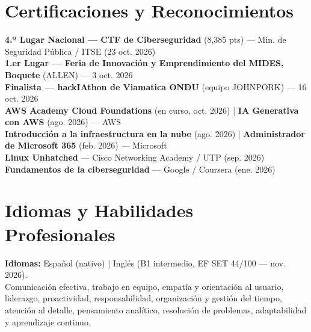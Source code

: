 \documentclass[10pt,a4paper]{article}
\begin{document}
\section*{Certificaciones y Reconocimientos}
{\small
\textbf{4.º Lugar Nacional — CTF de Ciberseguridad} (8,385 pts) — Min. de Seguridad Pública / ITSE (23 oct. 2026)\\
\textbf{1.er Lugar — Feria de Innovación y Emprendimiento del MIDES, Boquete} (ALLEN) — 3 oct. 2026\\
\textbf{Finalista — hackIAthon de Viamatica ONDU} (equipo JOHNPORK) — 16 oct. 2026\\
\textbf{AWS Academy Cloud Foundations} (en curso, oct. 2026) \;|\; \textbf{IA Generativa con AWS} (ago. 2026) — AWS\\
\textbf{Introducción a la infraestructura en la nube} (ago. 2026) \;|\; \textbf{Administrador de Microsoft 365} (feb. 2026) — Microsoft\\
\textbf{Linux Unhatched} — Cisco Networking Academy / UTP (sep. 2026)\\
\textbf{Fundamentos de la ciberseguridad} — Google / Coursera (ene. 2026)
}

\section*{Idiomas y Habilidades Profesionales}
{\small\textbf{Idiomas:} Español (nativo) \;|\; Inglés (B1 intermedio, EF SET 44/100 — nov. 2026).\\
Comunicación efectiva, trabajo en equipo, empatía y orientación al usuario, liderazgo, proactividad, responsabilidad, organización y gestión del tiempo, atención al detalle, pensamiento analítico, resolución de problemas, adaptabilidad y aprendizaje continuo.}
\end{document}
